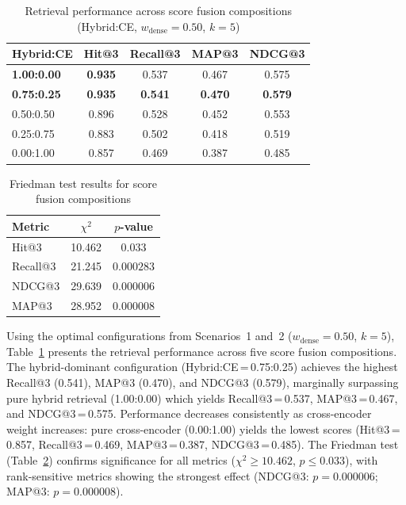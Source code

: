 \documentclass[conference]{IEEEtran}
\begin{document}
\begin{table}[H]
\centering
\caption{Retrieval performance across score fusion compositions (Hybrid:CE, $w_{\text{dense}}=0.50$, $k=5$)}
\label{tab:fusion}
\small
\begin{tabular}{lcccc}
\toprule
Hybrid:CE & Hit@3 & Recall@3 & MAP@3 & NDCG@3 \\
\midrule
\textbf{1.00:0.00} & \textbf{0.935} & 0.537 & 0.467 & 0.575 \\
\textbf{0.75:0.25} & \textbf{0.935} & \textbf{0.541} & \textbf{0.470} & \textbf{0.579} \\
0.50:0.50 & 0.896 & 0.528 & 0.452 & 0.553 \\
0.25:0.75 & 0.883 & 0.502 & 0.418 & 0.519 \\
0.00:1.00 & 0.857 & 0.469 & 0.387 & 0.485 \\
\bottomrule
\end{tabular}
\end{table}

\begin{table}[H]
\centering
\caption{Friedman test results for score fusion compositions}
\label{tab:fusion_friedman}
\small
\begin{tabular}{lcc}
\toprule
Metric & $\chi^2$ & $p$-value \\
\midrule
Hit@3    & 10.462 & $0.033$       \\
Recall@3 & 21.245 & $0.000283$    \\
NDCG@3   & 29.639 & $0.000006$    \\
MAP@3    & 28.952 & $0.000008$    \\
\bottomrule
\end{tabular}
\end{table}

Using the optimal configurations from Scenarios~1 and~2
($w_{\text{dense}}=0.50$, $k=5$), Table~\ref{tab:fusion} presents the
retrieval performance across five score fusion compositions. The
hybrid-dominant configuration (Hybrid:CE\,=\,0.75:0.25) achieves the
highest Recall@3 (0.541), MAP@3 (0.470), and NDCG@3 (0.579), marginally
surpassing pure hybrid retrieval (1.00:0.00) which yields
Recall@3\,=\,0.537, MAP@3\,=\,0.467, and NDCG@3\,=\,0.575.
Performance decreases consistently as cross-encoder weight increases:
pure cross-encoder (0.00:1.00) yields the lowest scores
(Hit@3\,=\,0.857, Recall@3\,=\,0.469, MAP@3\,=\,0.387,
NDCG@3\,=\,0.485). The Friedman test
(Table~\ref{tab:fusion_friedman}) confirms significance for all metrics
($\chi^2 \geq 10.462$, $p \leq 0.033$), with rank-sensitive metrics
showing the strongest effect (NDCG@3: $p = 0.000006$;
MAP@3: $p = 0.000008$).
\end{document}
